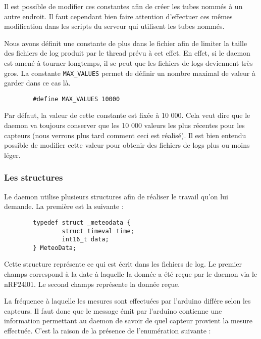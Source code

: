 Il est possible de modifier ces constantes afin de créer les tubes nommés à un 
autre endroit. Il faut cependant bien faire attention d'effectuer ces mêmes
modification dans les scripts du serveur qui utilisent les tubes nommés.

Nous avons définit une constante de plus dans le fichier afin de limiter la
taille des fichiers de log produit par le thread prévu à cet effet. En effet,
si le daemon est amené à tourner longtemps, il se peut que les fichiers de logs
deviennent très gros. La constante \texttt{MAX\_VALUES} permet de définir un
nombre maximal de valeur à garder dans ce cas là. \\

\begin{DDbox}{\linewidth}
\begin{lstlisting}
        #define MAX_VALUES 10000
\end{lstlisting}
\end{DDbox}

Par défaut, la valeur de cette constante est fixée à 10 000. Cela veut dire que
le daemon va toujours conserver que les 10 000 valeurs les plus récentes pour
les capteurs (nous verrons plus tard comment ceci est réalisé). Il est bien
entendu possible de modifier cette valeur pour obtenir des fichiers de logs plus
ou moins léger.

\pagebreak

\subsubsection{Les structures}

Le daemon utilise plusieurs structures afin de réaliser le travail qu'on lui
demande. La première est la suivante : \\

\begin{DDbox}{\linewidth}
\begin{lstlisting}
        typedef struct _meteodata {
                struct timeval time;
                int16_t data;
        } MeteoData;
\end{lstlisting}
\end{DDbox}

Cette structure représente ce qui est écrit dans les fichiers de log. Le premier
champs correspond à la date à laquelle la donnée a été reçue par le daemon via
le nRF24l01. Le second champs représente la donnée reçue.

La fréquence à laquelle les mesures sont effectuées par l'arduino différe selon
les capteurs. Il faut donc que le message émit par l'arduino contienne une 
information permettant au daemon de savoir de quel capteur provient la mesure
effectuée. C'est la raison de la présence de l'enumération suivante : \\

